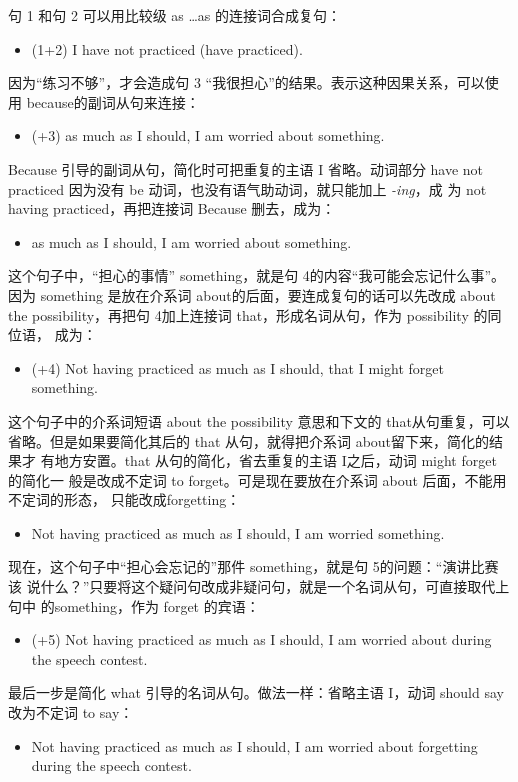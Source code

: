 句 1 和句 2 可以用比较级 as \ldots as 的连接词合成复句：
\begin{itemize}
\item (1+2) I have not practiced  (have practiced).
\end{itemize}
因为“练习不够”，才会造成句 3 “我很担心”的结果。表示这种因果关系，可以使
用 because的副词从句来连接：
\begin{itemize}
\item (+3)  as much as I should, I am
  worried about something.
\end{itemize}
Because 引导的副词从句，简化时可把重复的主语 I 省略。动词部分 have not
practiced 因为没有 be 动词，也没有语气助动词，就只能加上 \emph{-ing}，成
为 not having practiced，再把连接词 Because 删去，成为：
\begin{itemize}
\item {} as much as I should, I am worried about something.
\end{itemize}
这个句子中，“担心的事情” something，就是句 4的内容“我可能会忘记什么事”。
因为 something 是放在介系词 about的后面，要连成复句的话可以先改成 about the
possibility，再把句 4加上连接词 that，形成名词从句，作为 possibility 的同位语，
成为：
\begin{itemize}
\item (+4) Not having practiced as much as I should,  that I might forget something.
\end{itemize}
这个句子中的介系词短语 about the possibility 意思和下文的 that从句重复，可以
省略。但是如果要简化其后的 that 从句，就得把介系词 about留下来，简化的结果才
有地方安置。that 从句的简化，省去重复的主语 I之后，动词 might forget 的简化一
般是改成不定词 to forget。可是现在要放在介系词 about 后面，不能用不定词的形态，
只能改成forgetting：
\begin{itemize}
\item Not having practiced as much as I should, I am worried 
  something.
\end{itemize}
现在，这个句子中“担心会忘记的”那件 something，就是句 5的问题：“演讲比赛该
说什么？”只要将这个疑问句改成非疑问句，就是一个名词从句，可直接取代上句中
的something，作为 forget 的宾语：
\begin{itemize}
\item (+5) Not having practiced as much as I should, I am worried about
   during the speech contest.
\end{itemize}
最后一步是简化 what 引导的名词从句。做法一样：省略主语 I，动词 should
say 改为不定词 to say：
\begin{itemize}
\item Not having practiced as much as I should, I am worried about forgetting
   during the speech contest.
\end{itemize}


